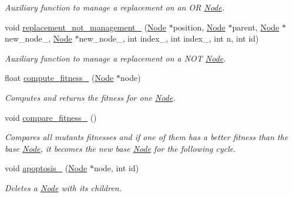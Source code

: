 \begin{DoxyCompactItemize}
\begin{DoxyCompactList}\small\item\em Auxiliary function to manage a replacement on an OR \hyperlink{classNode}{Node}. \end{DoxyCompactList}\item 
\mbox{\label{classEvolution_a4686436a67c724b9e682b92cc48e24c5}} 
void \hyperlink{classEvolution_a4686436a67c724b9e682b92cc48e24c5}{replacement\+\_\+not\+\_\+management\+\_\+} (\hyperlink{classNode}{Node} $\ast$position, \hyperlink{classNode}{Node} $\ast$parent, \hyperlink{classNode}{Node} $\ast$new\+\_\+node\+\_, \hyperlink{classNode}{Node} $\ast$new\+\_\+node\+\_, int index\+\_, int index\+\_, int n, int id)
\begin{DoxyCompactList}\small\item\em Auxiliary function to manage a replacement on a N\+OT \hyperlink{classNode}{Node}. \end{DoxyCompactList}\item 
\mbox{\label{classEvolution_a9863357caa544557ef14fc1c63476dd5}} 
float \hyperlink{classEvolution_a9863357caa544557ef14fc1c63476dd5}{compute\+\_\+fitness\+\_\+} (\hyperlink{classNode}{Node} $\ast$node)
\begin{DoxyCompactList}\small\item\em Computes and returns the fitness for one \hyperlink{classNode}{Node}. \end{DoxyCompactList}\item 
\mbox{\label{classEvolution_aa727c218cb791aac6204434a1c648e84}} 
void \hyperlink{classEvolution_aa727c218cb791aac6204434a1c648e84}{compare\+\_\+fitness\+\_\+} ()
\begin{DoxyCompactList}\small\item\em Compares all mutants\textquotesingle{} fitnesses and if one of them has a better fitness than the base \hyperlink{classNode}{Node}, it becomes the new base \hyperlink{classNode}{Node} for the following cycle. \end{DoxyCompactList}\item 
\mbox{\label{classEvolution_a593cd110aa18282f2d03b8539fc8db7f}} 
void \hyperlink{classEvolution_a593cd110aa18282f2d03b8539fc8db7f}{apoptosis\+\_\+} (\hyperlink{classNode}{Node} $\ast$node, int id)
\begin{DoxyCompactList}\small\item\em Deletes a \hyperlink{classNode}{Node} with its children. \end{DoxyCompactList}\item 

\end{DoxyCompactItemize}
